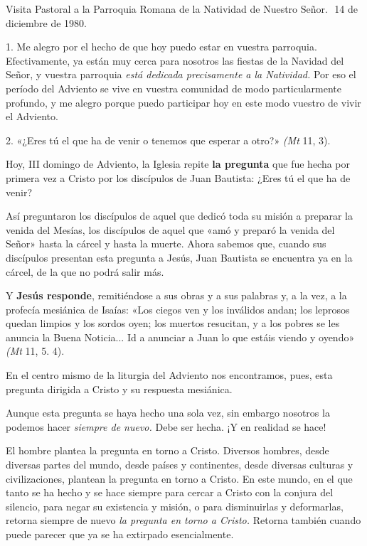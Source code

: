 Visita Pastoral a la Parroquia Romana de la Natividad de Nuestro Señor. 
14 de diciembre de 1980.

1. Me alegro por el hecho de que hoy puedo estar en vuestra parroquia.
Efectivamente, ya están muy cerca para nosotros las fiestas de la
Navidad del Señor, y vuestra parroquia \emph{está dedicada precisamente
	a la Natividad.} Por eso el período del Adviento se vive en vuestra
comunidad de modo particularmente profundo, y me alegro porque puedo
participar hoy en este modo vuestro de vivir el Adviento.

2. «¿Eres tú el que ha de venir o tenemos que esperar a otro?»
\emph{(Mt} 11, 3).

Hoy, III domingo de Adviento, la Iglesia repite \textbf{la pregunta} que
fue hecha por primera vez a Cristo por los discípulos de Juan Bautista:
¿Eres tú el que ha de venir?

Así preguntaron los discípulos de aquel que dedicó toda su misión a
preparar la venida del Mesías, los discípulos de aquel que «amó y
preparó la venida del Señor» hasta la cárcel y hasta la muerte. Ahora
sabemos que, cuando sus discípulos presentan esta pregunta a Jesús, Juan
Bautista se encuentra ya en la cárcel, de la que no podrá salir más.

Y \textbf{Jesús responde}, remitiéndose a sus obras y a sus palabras y,
a la vez, a la profecía mesiánica de Isaías: «Los ciegos ven y los
inválidos andan; los leprosos quedan limpios y los sordos oyen; los
muertos resucitan, y a los pobres se les anuncia la Buena Noticia... Id
a anunciar a Juan lo que estáis viendo y oyendo» \emph{(Mt} 11, 5. 4).

En el centro mismo de la liturgia del Adviento nos encontramos, pues,
esta pregunta dirigida a Cristo y su respuesta mesiánica.

Aunque esta pregunta se haya hecho una sola vez, sin embargo nosotros la
podemos hacer \emph{siempre de nuevo.} Debe ser hecha. ¡Y en realidad se
hace!

El hombre plantea la pregunta en torno a Cristo. Diversos hombres, desde
diversas partes del mundo, desde países y continentes, desde diversas
culturas y civilizaciones, plantean la pregunta en torno a Cristo. En
este mundo, en el que tanto se ha hecho y se hace siempre para cercar a
Cristo con la conjura del silencio, para negar su existencia y misión, o
para disminuirlas y deformarlas, retorna siempre de nuevo \emph{la
	pregunta en torno a Cristo.} Retorna también cuando puede parecer que ya
se ha extirpado esencialmente.

